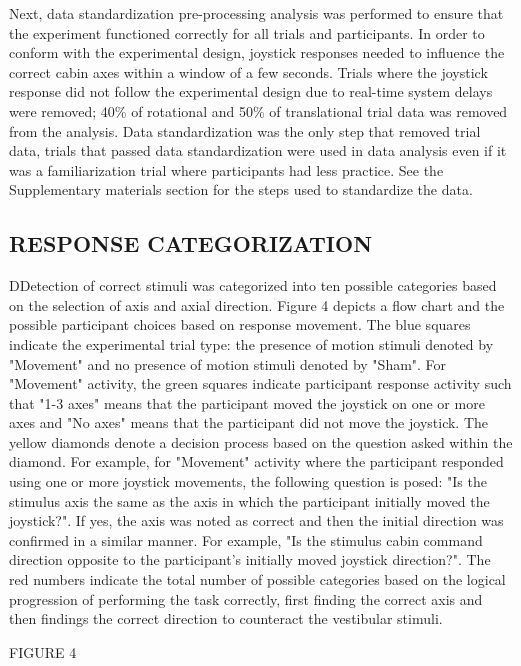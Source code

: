 \documentclass[11pt, onecolumn]{article}
\begin{document}
Next, data standardization pre-processing analysis was performed to ensure that the experiment functioned correctly for all trials and participants.  In order to conform with the experimental design, joystick responses needed to influence the correct cabin axes within a window of a few seconds.  Trials where the joystick response did not follow the experimental design due to real-time system delays were removed; 40\% of rotational and 50\% of translational trial data was removed from the analysis.  Data standardization was the only step that removed trial data, trials that passed data standardization were used in data analysis even if it was a familiarization trial where participants had less practice.  See the Supplementary materials section for the steps used to standardize the data.

\subsection{RESPONSE CATEGORIZATION}
DDetection of correct stimuli was categorized into ten possible categories based on the selection of axis and axial direction.  Figure 4 depicts a flow chart and the possible participant choices based on response movement.  The blue squares indicate the experimental trial type: the presence of motion stimuli denoted by "Movement" and no presence of motion stimuli denoted by "Sham".  For "Movement" activity, the green squares indicate participant response activity such that "1-3 axes" means that the participant moved the joystick on one or more axes and "No axes" means that the participant did not move the joystick.  The yellow diamonds denote a decision process based on the question asked within the diamond.  For example, for "Movement" activity where the participant responded using one or more joystick movements, the following question is posed: "Is the stimulus axis the same as the axis in which the participant initially moved the joystick?".  If yes, the axis was noted as correct and then the initial direction was confirmed in a similar manner.  For example, "Is the stimulus cabin command direction opposite to the  participant’s initially moved joystick direction?".  The red numbers indicate the total number of possible categories based on the logical progression of performing the task correctly, first finding the correct axis and then findings the correct direction to counteract the vestibular stimuli. 

FIGURE 4
\end{document}
